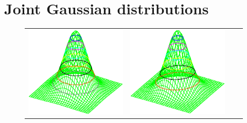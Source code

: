 
\section{Joint Gaussian distributions}
\begin{figure}
\begin{tabular}{*{4}{c}}
  \includegraphics[width=\tw/4-5mm,clip=true]{../common/normxy_00.eps} &
  \includegraphics[width=\tw/4-5mm,clip=true]{../common/normxy_50.eps} &

\end{tabular}
\end{figure}
